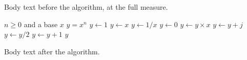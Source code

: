 \documentclass{article}
\begin{document}
Body text before the algorithm, at the full measure.

\begin{algorithmic}[1]
\REQUIRE $n \ge 0$ and a base $x$
\ENSURE $y = x^{n}$
\STATE $y \gets 1$
  \STATE $y \gets x$ 
  \STATE $y \gets 1 / x$
\ELSE
  \STATE $y \gets 0$
\ENDIF
{}
    \STATE $y \gets y \times x$
  \ENDWHILE
\ENDFOR
{}
  \STATE $y \gets y + j$
\ENDFOR
\REPEAT
  \STATE $y \gets y / 2$
\LOOP
  \STATE $y \gets y + 1$
\ENDLOOP
\RETURN $y$
\end{algorithmic}

Body text after the algorithm.
\end{document}
